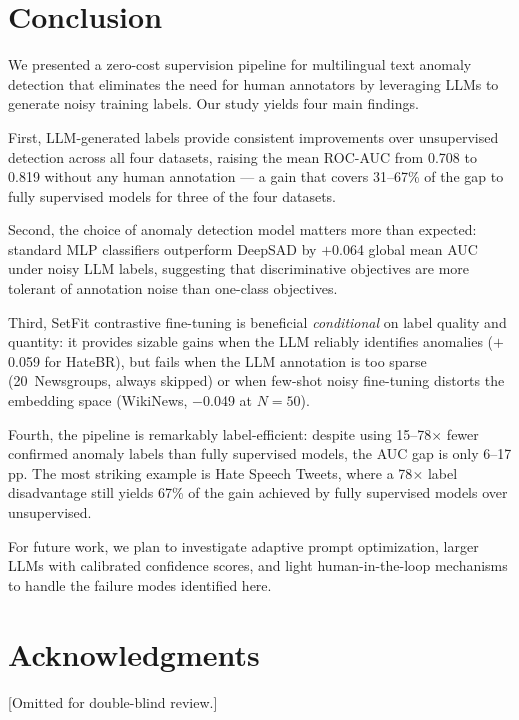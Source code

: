 \documentclass[12pt]{article}
\begin{document}
\section{Conclusion}

We presented a zero-cost supervision pipeline for multilingual text anomaly 
detection that eliminates the need for human annotators by leveraging LLMs 
to generate noisy training labels. Our study yields four main findings.

First, LLM-generated labels provide consistent improvements over unsupervised 
detection across all four datasets, raising the mean ROC-AUC from 0.708 to 
0.819 without any human annotation --- a gain that covers 31--67\% of the
gap to fully supervised models for three of the four datasets.

Second, the choice of anomaly detection model matters more than expected: 
standard MLP classifiers outperform DeepSAD by $+$0.064 global mean AUC 
under noisy LLM labels, suggesting that discriminative objectives are more 
tolerant of annotation noise than one-class objectives.

Third, SetFit contrastive fine-tuning is beneficial \textit{conditional} on 
label quality and quantity: it provides sizable gains when the LLM reliably 
identifies anomalies ($+$0.059 for HateBR), but fails when the LLM annotation 
is too sparse (20~Newsgroups, always skipped) or when few-shot noisy fine-tuning 
distorts the embedding space (WikiNews, $-$0.049 at $N=50$).

Fourth, the pipeline is remarkably label-efficient: despite using 15--78$\times$
fewer confirmed anomaly labels than fully supervised models, the AUC gap is only 6--17 pp.
The most striking example is Hate Speech Tweets, where a 78$\times$ label
disadvantage still yields 67\% of the gain achieved by fully supervised models over unsupervised.

For future work, we plan to investigate adaptive prompt optimization, larger 
LLMs with calibrated confidence scores, and light human-in-the-loop mechanisms 
to handle the failure modes identified here.

\section*{Acknowledgments}
\small
[Omitted for double-blind review.]
\normalsize



\end{document}
